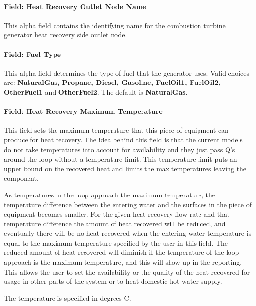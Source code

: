 \paragraph{Field: Heat Recovery Outlet Node Name}\label{field-heat-recovery-outlet-node-name-1}

This alpha field contains the identifying name for the combustion turbine generator heat recovery side outlet node.

\paragraph{Field: Fuel Type}\label{field-fuel-type-1}

This alpha field determines the type of fuel that the generator uses. Valid choices are: \textbf{NaturalGas, Propane, Diesel, Gasoline, FuelOil1, FuelOil2, OtherFuel1} and \textbf{OtherFuel2}. The default is \textbf{NaturalGas}.

\paragraph{Field: Heat Recovery Maximum Temperature}\label{field-heat-recovery-maximum-temperature-1}

This field sets the maximum temperature that this piece of equipment can produce for heat recovery. The idea behind this field is that the current models do not take temperatures into account for availability and they just pass Q's around the loop without a temperature limit. This temperature limit puts an upper bound on the recovered heat and limits the max temperatures leaving the component.

As temperatures in the loop approach the maximum temperature, the temperature difference between the entering water and the surfaces in the piece of equipment becomes smaller. For the given heat recovery flow rate and that temperature difference the amount of heat recovered will be reduced, and eventually there will be no heat recovered when the entering water temperature is equal to the maximum temperature specified by the user in this field. The reduced amount of heat recovered will diminish if the temperature of the loop approach is the maximum temperature, and this will show up in the reporting. This allows the user to set the availability or the quality of the heat recovered for usage in other parts of the system or to heat domestic hot water supply.

The temperature is specified in degrees C.

